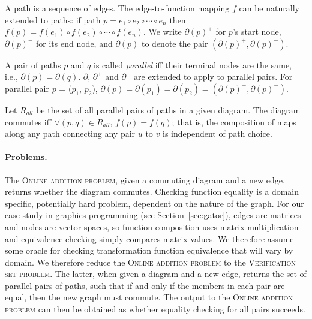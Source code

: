 \documentclass[sigplan,review,anonymous]{acmart}
\begin{document}
A path is a sequence of edges. The edge-to-function mapping $f$ can be naturally extended to paths: if path $p=e_1\circ e_2 \circ \cdots \circ e_n$ then $f(p)=f(e_1) \circ f(e_2) \circ \cdots \circ f(e_n)$.
%
We write $\partial(p)^{+}$ for $p$'s start node, $\partial(p)^{-}$ for its end node, and $\partial(p)$ to denote the pair
$(\partial(p)^{+}, \partial(p)^{-})$.

A pair of paths $p$ and $q$ is called \textit{parallel} iff their terminal nodes are the same, i.e., $\partial(p)=\partial(q)$.
$\partial$, $\partial^{+}$ and $\partial^{-}$ are extended to apply to parallel pairs.
For parallel pair $p$ = ($p_1$, $p_2$), $\partial(p)=\partial(p_1)=\partial(p_2)=(\partial(p)^{+}, \partial(p)^{-})$.

Let $R_{all}$ be the set of all parallel pairs of paths in a given diagram.
The diagram commutes iff
$\forall (p,q)\in R_{all}$,
$f(p)=f(q)$; that is, the composition of maps along any path connecting any pair $u$ to $v$ is independent of path choice.

\paragraph{Problems.}

The \textsc{Online addition problem}, given a commuting diagram and a new edge, returns whether the diagram commutes.
Checking function equality is a domain specific, potentially hard problem, dependent on the nature of the graph.
For our case study in graphics programming (see Section~\ref{sec:gator}), edges are matrices and nodes are vector spaces, so function composition uses matrix multiplication and equivalence checking simply compares matrix values.
We therefore assume some oracle for checking transformation function equivalence that will vary by domain.
%
We therefore reduce the \textsc{Online addition problem} to the \textsc{Verification set problem}.
The latter, when given a diagram and a new edge, returns the set of parallel pairs of paths, such that if and only if the members in each pair are equal, then the new graph must commute.
The output to the \textsc{Online addition problem} can then be obtained as whether equality checking for all pairs succeeds.
\end{document}
